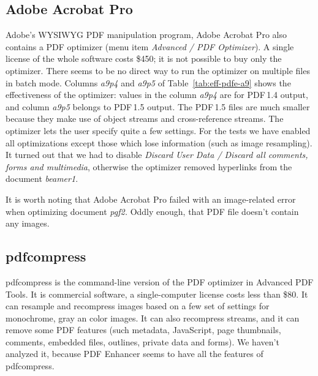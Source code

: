 \documentclass{ltugproc}
\def\cmd{\textsf}
\begin{document}
\subsection{Adobe Acrobat Pro}

Adobe's WYSIWYG PDF manipulation program, Adobe Acrobat Pro
\cite{acrobatpro} also contains a PDF optimizer (menu item \emph{Advanced /
PDF Optimizer}). A single license of the
whole software costs \$450; it is not possible to buy only the optimizer.
There seems to be no direct way to run the optimizer on multiple files in
batch mode. Columns \emph{a9p4} and \emph{a9p5} of
Table~\ref{tab:eff-pdfe-a9} shows the effectiveness of the optimizer: values
in the column \emph{a9p4} are for PDF\,1.4 output, and column \emph{a9p5}
belongs to PDF\,1.5 output. The PDF\,1.5 files are much smaller because they
make use of object streams and cross-reference streams. The optimizer lets
the user specify quite a few settings. For the tests we have enabled all
optimizations except those which lose information (such as image
resampling). It turned out that we had to disable \emph{Discard User Data /
Discard all comments, forms and multimedia}, otherwise the optimizer removed
hyperlinks from the document \emph{beamer1}.

It is worth noting that Adobe Acrobat Pro failed with an image-related error
when optimizing document \emph{pgf2.} Oddly enough, that PDF file doesn't
contain any images.


\subsection{pdfcompress}

\cmd{pdfcompress} \cite{pdfcompress} is the command-line version of the PDF
optimizer in Advanced PDF Tools. It is commercial software, a
single-computer license costs less than \$80. It can resample and recompress
images based on a few set of settings for monochrome, gray an color images.
It can also recompress streams, and it can remove some PDF features (such
metadata, JavaScript, page thumbnails, comments, embedded files, outlines,
private data and forms). We haven't analyzed it, because PDF Enhancer
seems to have all the features of \cmd{pdfcompress}.
\end{document}
